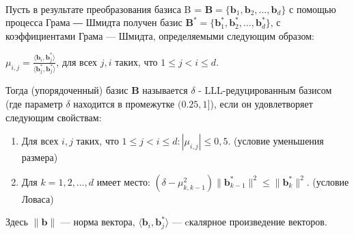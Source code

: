 \documentclass[12pt,a4paper]{scrartcl}
\begin{document}
\\


Пусть в результате преобразования базиса B = $\mathbf {B} =\{\mathbf {b} _{1},\mathbf {b} _{2},\dots ,\mathbf {b} _{d}\}$ с помощью процесса Грама ― Шмидта получен базис $\mathbf {B} ^{*}=\{\mathbf {b} _{1}^{*},\mathbf {b} _{2}^{*},\dots ,\mathbf {b} _{d}^{*}\}$, с коэффициентами Грама — Шмидта, определяемыми следующим образом:

\begin{center}
	$\mu _{i,j}={\frac {\langle \mathbf {b} _{i},\mathbf {b} _{j}^{*}\rangle }{\langle \mathbf {b} _{j}^{*},\mathbf {b} _{j}^{*}\rangle }}$, для всех $j,i$ таких, что $1\leqslant j<i\leqslant d$.
\end{center}

Тогда (упорядоченный) базис $\mathbf {B}$ называется $\delta$ - LLL-редуцированным базисом (где параметр $\delta$ находится в промежутке $(0.25,1]$), если он удовлетворяет следующим свойствам:

\begin{enumerate}
	\item Для всех $i,j$ таких, что $1\leqslant j<i\leqslant d\colon \left|\mu _{i,j}\right|\leqslant 0{,}5$. (условие уменьшения размера)
	\item Для $k=1,2,\dots ,d$ имеет место: $(\delta -\mu _{k,k-1}^{2})\|\mathbf {b}_{k-1}^{*}\|^{2}\leqslant \|\mathbf {b} _{k}^{*}\|^{2}$. (условие Ловаса)
	
\end{enumerate}


Здесь $\|\mathbf {b} \|$ — норма вектора, $\langle \mathbf {b} _{i},\mathbf {b} _{j}^{*}\rangle$ — cкалярное произведение векторов.
\end{document}
